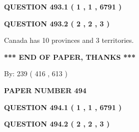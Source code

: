 \documentclass[12pt]{article}
\begin{document}
   
  
\vspace{0.2in}
  
{\textbf{\Large{QUESTION
493.1 
 ( 1 , 1 , 6791 )
}}}
  
  
  
\vspace{0.2in}
  
{\textbf{\Large{QUESTION
493.2 
 ( 2 , 2 , 3 )
}}}
  
  
 
 
\noindent{}
 
 
Canada has 10  provinces and 3 territories.
 
 
 
 
   
   
 \vspace{0.2in}
 
   
   
   
   
\vspace{1.0in} 
{\textbf{\large{ *** END OF PAPER, THANKS *** }}} 
   
   
\hspace{1.0in} By: 
 239 ( 416 ,  613 )
   
   
   
   
\newpage 
\setcounter{page}{ 
   494001 } 
   
   
   
   
 {\textbf{ \Large{ PAPER NUMBER  494  }}}
   
   
\vspace{0.2in}
   
   
   
   
   
   
 \vspace{0.2in}
 
 
 
 
   
   
  
\vspace{0.2in}
  
{\textbf{\Large{QUESTION
494.1 
 ( 1 , 1 , 6791 )
}}}
  
  
  
\vspace{0.2in}
  
{\textbf{\Large{QUESTION
494.2 
 ( 2 , 2 , 3 )
}}}
  
\end{document}
